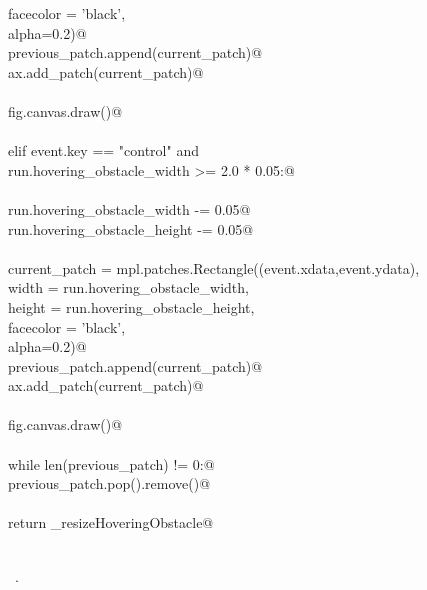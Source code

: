 \documentclass[11.5pt]{report}
\begin{document}
\begin{flushleft}
\begin{list}{}{}
\mbox{}\verb@                                                   facecolor = 'black', \@\\
\mbox{}\verb@                                                   alpha=0.2)@\\
\mbox{}\verb@                previous_patch.append(current_patch)@\\
\mbox{}\verb@                ax.add_patch(current_patch)@\\
\mbox{}\verb@@\\
\mbox{}\verb@                fig.canvas.draw()@\\
\mbox{}\verb@@\\
\mbox{}\verb@            elif event.key == "control" and \@\\
\mbox{}\verb@                run.hovering_obstacle_width >= 2.0 * 0.05:@\\
\mbox{}\verb@@\\
\mbox{}\verb@                run.hovering_obstacle_width  -= 0.05@\\
\mbox{}\verb@                run.hovering_obstacle_height -= 0.05@\\
\mbox{}\verb@@\\
\mbox{}\verb@                current_patch = mpl.patches.Rectangle((event.xdata,event.ydata),           \@\\
\mbox{}\verb@                                                   width     = run.hovering_obstacle_width,  \@\\
\mbox{}\verb@                                                   height    = run.hovering_obstacle_height, \@\\
\mbox{}\verb@                                                   facecolor = 'black', \@\\
\mbox{}\verb@                                                   alpha=0.2)@\\
\mbox{}\verb@                previous_patch.append(current_patch)@\\
\mbox{}\verb@                ax.add_patch(current_patch)@\\
\mbox{}\verb@@\\
\mbox{}\verb@                fig.canvas.draw()@\\
\mbox{}\verb@@\\
\mbox{}\verb@            while len(previous_patch) != 0:@\\
\mbox{}\verb@                previous_patch.pop().remove()@\\
\mbox{}\verb@@\\
\mbox{}\verb@        return _resizeHoveringObstacle@\\
\mbox{}\verb@@\\
\mbox{}\verb@@{\NWsep}
\end{list}
\vspace{-1.5ex}
\footnotesize
\begin{list}{}{\setlength{\itemsep}{-\parsep}\setlength{\itemindent}{-\leftmargin}}
\item \NWtxtMacroRefIn\ .

\item{}
\end{list}
\vspace{4ex}
\end{flushleft}
\end{document}
